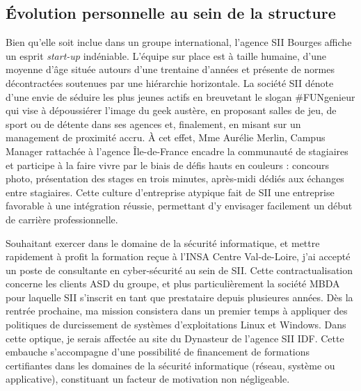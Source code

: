   \subsection{\'{E}volution personnelle au sein de la structure}
  
  Bien qu'elle soit inclue dans un groupe international, l'agence SII Bourges affiche un esprit \emph{start-up} indéniable. 
  L'équipe sur place est à taille humaine, d'une moyenne d'âge située autours d'une trentaine d'années et présente de normes décontractées soutenues par une hiérarchie horizontale.
  La société SII dénote d'une envie de séduire les plus jeunes actifs en breuvetant le slogan \#FUNgenieur qui vise à dépoussiérer l'image du geek austère, en proposant salles de jeu, de sport ou de détente dans ses agences et, 
  finalement, en misant sur un management de proximité accru.
  \`{A} cet effet, Mme Aurélie Merlin, Campus Manager rattachée à l'agence Île-de-France encadre la communauté de stagiaires et participe à la faire vivre par le biais de défis hauts en couleurs : concours photo, présentation 
  des stages en trois minutes, après-midi dédiés aux échanges entre stagiaires. 
  Cette culture d'entreprise atypique fait de SII une entreprise favorable à une intégration réussie, permettant d'y envisager facilement un début de carrière professionnelle. 
  
  Souhaitant exercer dans le domaine de la sécurité informatique, et mettre rapidement à profit la formation reçue à l'INSA Centre Val-de-Loire, j'ai accepté un poste de consultante en cyber-sécurité au sein de SII.
  Cette contractualisation concerne les clients \gls{ASD} du groupe, et plus particulièrement la société MBDA pour laquelle SII s'inscrit en tant que prestataire depuis plusieures années. 
  Dès la rentrée prochaine, ma mission consistera dans un premier temps à appliquer des politiques de durcissement de systèmes d'exploitations Linux et Windows. 
  Dans cette optique, je serais affectée au site du Dynasteur de l'agence SII \gls{IDF}. 
  Cette embauche s'accompagne d'une possibilité de financement de formations certifiantes dans les domaines de la sécurité informatique (réseau, système ou applicative), constituant un facteur de motivation non négligeable.  
  